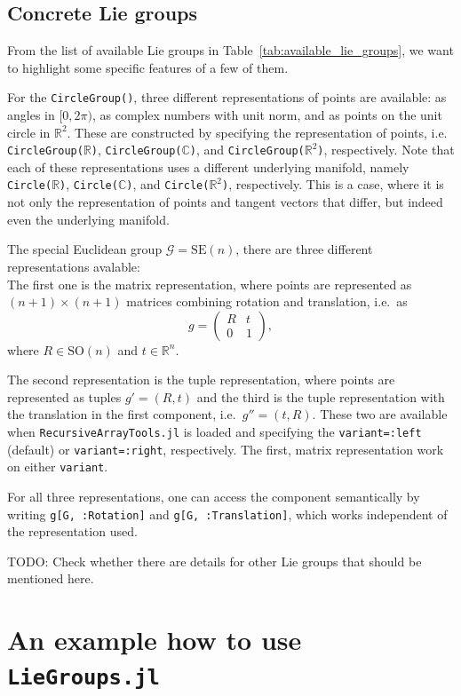\documentclass{juliacon}
\begin{document}
\subsection{Concrete Lie groups}\label{subsec:ConcreteLieGroups}

From the list of available Lie groups in Table~\ref{tab:available_lie_groups}, we want to highlight some specific features of a few of them.

For the \verb|CircleGroup()|, three different representations of points are available: as angles in \([0, 2\pi)\), as complex numbers with unit norm, and as points on the unit circle in \(\mathbb{R}^2\).
These are constructed by specifying the representation of points, i.e. \verb|CircleGroup(|$\mathbb R$\verb|)|, \verb|CircleGroup(|$\mathbb C$\verb|)|, and \verb|CircleGroup(|$\mathbb R^2$\verb|)|, respectively. Note that each of these representations uses a different underlying manifold, namely \verb|Circle(|$\mathbb R$\verb|)|, \verb|Circle(|$\mathbb C$\verb|)|, and \verb|Circle(|$\mathbb R^2$\verb|)|, respectively.
This is a case, where it is not only the representation of points and tangent vectors that differ, but indeed even the underlying manifold.

The special Euclidean group \(\mathcal G = \mathrm{SE}(n)\), there are three different representations avalable:
\\
The first one is the matrix representation, where points are represented as \((n+1) \times (n+1)\) matrices combining rotation and translation, i.e.\ as
\begin{equation*}
    g = \begin{pmatrix} R & t \\
    0 & 1 \end{pmatrix},
\end{equation*}
where \(R \in \mathrm{SO}(n)\) and \(t \in \mathbb{R}^n\).

The second representation is the tuple representation, where points are represented as tuples \(g' = (R, t)\) and the third is the tuple representation with the translation in the first component, i.e.\ \(g'' = (t, R)\). These two are available when \verb|RecursiveArrayTools.jl| is loaded and specifying the \verb|variant=:left| (default) or \verb|variant=:right|, respectively.
The first, matrix representation work on either \verb|variant|.

For all three representations, one can access the component semantically by writing \verb|g[G, :Rotation]| and \verb|g[G, :Translation]|, which works independent of the representation used.

{\color{red}TODO: Check whether there are details for other Lie groups that should be mentioned here.}

\section{An example how to use {\texttt{LieGroups.jl}}}\label{sec:Example}

\end{document}
